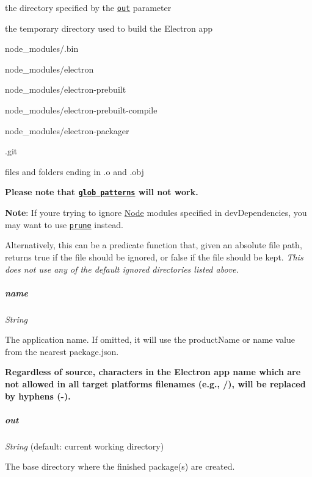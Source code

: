 \begin{DoxyItemize}
\item the directory specified by the \href{#out}{\tt {\ttfamily out}} parameter
\item the temporary directory used to build the Electron app
\item {\ttfamily node\+\_\+modules/.bin}
\item {\ttfamily node\+\_\+modules/electron}
\item {\ttfamily node\+\_\+modules/electron-\/prebuilt}
\item {\ttfamily node\+\_\+modules/electron-\/prebuilt-\/compile}
\item {\ttfamily node\+\_\+modules/electron-\/packager}
\item {\ttfamily .git}
\item files and folders ending in {\ttfamily .o} and {\ttfamily .obj}
\end{DoxyItemize}

{\bfseries Please note that \href{https://en.wikipedia.org/wiki/Glob_%28programming%29}{\tt glob patterns} will not work.}

{\bfseries Note}\+: If you\textquotesingle{}re trying to ignore \mbox{\hyperlink{classNode}{Node}} modules specified in {\ttfamily dev\+Dependencies}, you may want to use \href{#prune}{\tt {\ttfamily prune}} instead.

Alternatively, this can be a predicate function that, given an absolute file path, returns {\ttfamily true} if the file should be ignored, or {\ttfamily false} if the file should be kept. {\itshape This does not use any of the default ignored directories listed above.}

\subparagraph*{{\ttfamily name}}

{\itshape String}

The application name. If omitted, it will use the {\ttfamily product\+Name} or {\ttfamily name} value from the nearest {\ttfamily package.\+json}.

{\bfseries Regardless of source, characters in the Electron app name which are not allowed in all target platforms\textquotesingle{} filenames (e.\+g., {\ttfamily /}), will be replaced by hyphens ({\ttfamily -\/}).}

\subparagraph*{{\ttfamily out}}

{\itshape String} (default\+: current working directory)

The base directory where the finished package(s) are created.

